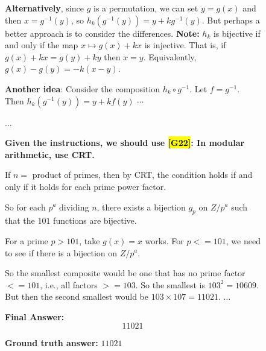 \documentclass{article}
\theoremstyle{plain}
\theoremstyle{definition}
\theoremstyle{remark}
\begin{document}
\begin{figure}[!tb]
\begin{runcard}[title={Example of How E-SPL Shapes Model Behavior}]
\begin{runbox}[title={Model Output}]
\textbf{Alternatively}, since \(g\) is a permutation, we can set \(y = g(x)\) and then \(x = g^{-1}(y)\), so
$h_k(g^{-1}(y)) = y + k g^{-1}(y).$
{But perhaps} a better approach is to consider the differences.
\textbf{Note:}
\(h_k\) is bijective if and only if the map \(x \mapsto g(x) + kx\) is injective. That is, if
$g(x) + kx = g(y) + ky$
then \(x = y\). Equivalently, $g(x) - g(y) = -k(x-y).$

\textbf{Another idea}: Consider the composition \(h_k \circ g^{-1}\). Let \(f = g^{-1} \). Then \(h_k(g^{-1}(y)) = y + k f(y)\) $\cdots$

$\dots$

{\color{Brown}\textbf{Given the instructions, we should use \hl{[G22]}: In modular arithmetic, use CRT.}}

If $n=$ product of primes, then by CRT, the condition holds if and only if it holds for each prime power factor.

So for each $p^a$ dividing $n$, there exists a bijection $g_p$ on $Z/p^a$ such that the $101$ functions are bijective.

For a prime $p > 101$, take $g(x)=x$ works. For $p <= 101$, we need to see if there is a bijection on $Z/p^a$.

So the smallest composite would be one that has no prime factor $<=101$, i.e., all factors $>=103$. So the smallest is $103^2=10609$. But then the second smallest would be $103\times 107=11021$. \quad $\dots$

\medskip
\textbf{Final Answer:}
\[
\boxed{11021}
\]

\end{runbox}

\textbf{Ground truth answer:} $11021$
\end{runcard}
\label{tab:example-e-spl-1}

\end{figure}
\end{document}
